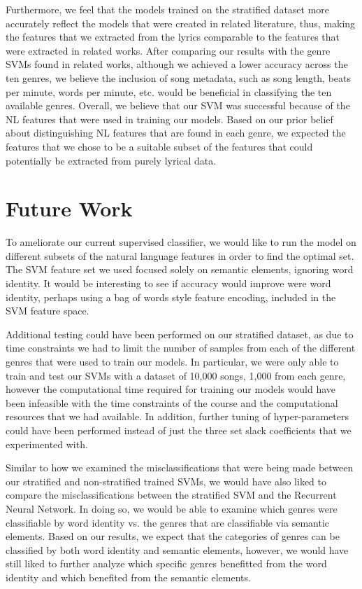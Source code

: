 \documentclass[journal]{IEEEtran}
\begin{document}
Furthermore, we feel that the models trained on the stratified dataset more accurately reflect the models that were created in related literature, thus, making the features that we extracted from the lyrics comparable to the features that were extracted in related works. After comparing our results with the genre SVMs found in related works, although we achieved a lower accuracy across the ten genres, we believe the inclusion of song metadata, such as song length, beats per minute, words per minute, etc. would be beneficial in classifying the ten available genres. Overall, we believe that our SVM was successful because of the NL features that were used in training our models. Based on our prior belief about distinguishing NL features that are found in each genre, we expected the features that we chose to be a suitable subset of the features that could potentially be extracted from purely lyrical data.


\section{Future Work}

To ameliorate our current supervised classifier, we would like to run the model on different subsets of the natural language features in order to find the optimal set. The SVM feature set we used focused solely on semantic elements, ignoring word identity. It would be interesting to see if accuracy would improve were word identity, perhaps using a bag of words style feature encoding, included in the SVM feature space.

Additional testing could have been performed on our stratified dataset, as due to time constraints we had to limit the number of samples from each of the different genres that were used to train our models. In particular, we were only able to train and test our SVMs with a dataset of 10,000 songs, 1,000 from each genre, however the computational time required for training our models would have been infeasible with the time constraints of the course and the computational resources that we had available. In addition, further tuning of hyper-parameters could have been performed instead of just the three set slack coefficients that we experimented with.

Similar to how we examined the misclassifications that were being made between our stratified and non-stratified trained SVMs, we would have also liked to compare the misclassifications between the stratified SVM and the Recurrent Neural Network. In doing so, we would be able to examine which genres were classifiable by word identity vs. the genres that are classifiable via semantic elements.
Based on our results, we expect that the categories of genres can be classified by both word identity and semantic elements, however, we would have still liked to further analyze which specific genres benefitted from the word identity and which benefited from the semantic elements.
\end{document}
